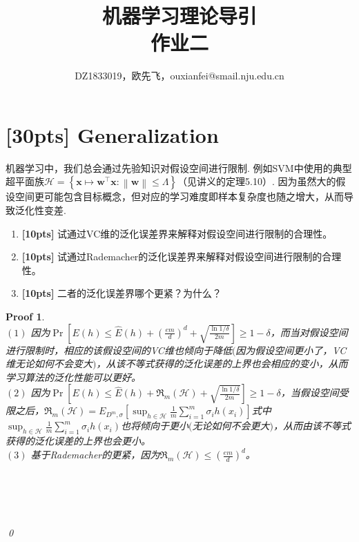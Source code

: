 \documentclass[a4paper,UTF8]{article}
\numberwithin{equation}{section}
\newtheorem*{myProof}{Proof}
\begin{document}
\renewcommand{\tilde}{\widetilde}
\renewcommand{\hat}{\widehat}

	\title{机器学习理论导引\\
		作业二}
	\author{DZ1833019，欧先飞，ouxianfei@smail.nju.edu.cn}
	\maketitle
	
	
	\section{[30pts] Generalization}
	
	机器学习中，我们总会通过先验知识对假设空间进行限制. 例如SVM中使用的典型超平面族$\mathcal{H} = \left\lbrace \boldsymbol{x} \mapsto \boldsymbol{w}^{\top}\boldsymbol{x} : \left\| \boldsymbol{w} \right\| \leq \Lambda  \right\rbrace $（见讲义的定理5.10）. 因为虽然大的假设空间更可能包含目标概念，但对应的学习难度即样本复杂度也随之增大，从而导致泛化性变差.
	
	
	\begin{enumerate}[(1)]
		\item \textbf{[10pts]}  试通过VC维的泛化误差界来解释对假设空间进行限制的合理性。
		
		\item \textbf{[10pts]}  试通过Rademacher的泛化误差界来解释对假设空间进行限制的合理性。
		
		\item \textbf{[10pts]}	二者的泛化误差界哪个更紧？为什么？
	\end{enumerate}
	
	
	\begin{myProof}~\\
$(1)$ 因为$\Pr[E(h) \le \hat{E}(h) + \left( \frac{em}{d}\right)^d  + \sqrt{\frac{\ln 1 / \delta}{2m}}] \ge 1 - \delta$，而当对假设空间进行限制时，相应的该假设空间的VC维也倾向于降低$($因为假设空间更小了，VC维无论如何不会变大$)$，从该不等式获得的泛化误差的上界也会相应的变小，从而学习算法的泛化性能可以更好。
~\\
$(2)$ 因为$\Pr[E(h) \le \hat{E}(h) + \mathfrak{R}_m(\mathcal{H})  + \sqrt{\frac{\ln 1 / \delta}{2m}}] \ge 1 - \delta$，当假设空间受限之后，$\mathfrak{R}_m(\mathcal{H}) = E_{D^m, \sigma}[\sup_{h \in \mathcal{H}}\frac{1}{m} \sum_{i=1}^m \sigma_i h(x_i) ]$式中$\sup_{h \in \mathcal{H}}\frac{1}{m} \sum_{i=1}^m \sigma_i h(x_i)$也将倾向于更小$($无论如何不会更大$)$，从而由该不等式获得的泛化误差的上界也会更小。
~\\
$(3)$ 基于Rademacher的更紧，因为$\mathfrak{R}_m(\mathcal{H}) \le \left( \frac{em}{d}\right)^d$。
		
		~\\
		~\\
		~\\
		~\\
		\qed
	\end{myProof}
	\newpage
\end{document}

